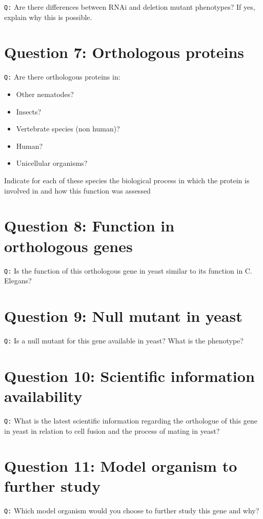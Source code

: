 \documentclass[11pt, a4paper,titlepage]{article}
\begin{document}
\texttt{Q:} Are there differences between RNAi and deletion mutant
phenotypes? If yes, explain why this is possible.


\section*{Question 7: Orthologous proteins}

\texttt{Q:} Are there orthologous proteins in:
\begin{itemize}
\itemsep0em 
\item Other nematodes?
\item Insects?
\item Vertebrate species (non human)?
\item Human?
\item Unicellular organisms?
\end{itemize}
Indicate for each of these species the biological process in which the
protein is involved in and how this function was assessed


\section*{Question 8: Function in orthologous genes}

\texttt{Q:} Is the function of this orthologous gene in yeast similar
to its function in C. Elegans?


\section*{Question 9: Null mutant in yeast}

\texttt{Q:} Is a null mutant for this gene available in yeast? What is
the phenotype?


\section*{Question 10: Scientific information availability}

\texttt{Q:} What is the latest scientific information regarding the
orthologue of this gene in yeast in relation to cell fusion and the
process of mating in yeast?


\section*{Question 11: Model organism to further study}

\texttt{Q:} Which model organism would you choose to further study
this gene and why?


 
\end{document}
